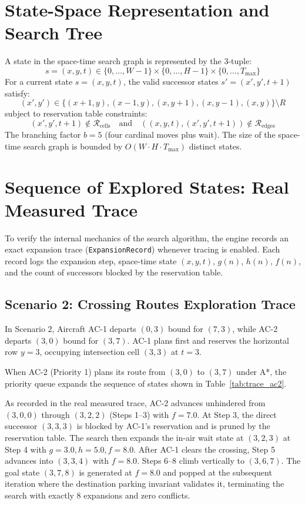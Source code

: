\documentclass[11pt,a4paper]{article}
\begin{document}
\section{State-Space Representation and Search Tree}
A state in the space-time search graph is represented by the 3-tuple:
\begin{equation}
s = (x, y, t) \in \{0, \dots, W-1\} \times \{0, \dots, H-1\} \times \{0, \dots, T_{\max}\}
\end{equation}
For a current state $s = (x, y, t)$, the valid successor states $s' = (x', y', t+1)$ satisfy:
\begin{equation}
(x', y') \in \{(x+1, y), (x-1, y), (x, y+1), (x, y-1), (x, y)\} \setminus R
\end{equation}
subject to reservation table constraints:
\begin{equation}
(x', y', t+1) \notin \mathcal{R}_{\text{cells}} \quad \text{and} \quad ((x, y, t), (x', y', t+1)) \notin \mathcal{R}_{\text{edges}}
\end{equation}
The branching factor $b = 5$ (four cardinal moves plus wait). The size of the space-time search graph is bounded by $O(W \cdot H \cdot T_{\max})$ distinct states.

\section{Sequence of Explored States: Real Measured Trace}
To verify the internal mechanics of the search algorithm, the engine records an exact expansion trace (\texttt{ExpansionRecord}) whenever tracing is enabled. Each record logs the expansion step, space-time state $(x, y, t)$, $g(n)$, $h(n)$, $f(n)$, and the count of successors blocked by the reservation table.

\subsection{Scenario 2: Crossing Routes Exploration Trace}
In Scenario 2, Aircraft AC-1 departs $(0, 3)$ bound for $(7, 3)$, while AC-2 departs $(3, 0)$ bound for $(3, 7)$. AC-1 plans first and reserves the horizontal row $y=3$, occupying intersection cell $(3, 3)$ at $t=3$.

When AC-2 (Priority 1) plans its route from $(3, 0)$ to $(3, 7)$ under A*, the priority queue expands the sequence of states shown in Table~\ref{tab:trace_ac2}.



As recorded in the real measured trace, AC-2 advances unhindered from $(3, 0, 0)$ through $(3, 2, 2)$ (Steps 1--3) with $f=7.0$. At Step 3, the direct successor $(3, 3, 3)$ is blocked by AC-1's reservation and is pruned by the reservation table. The search then expands the in-air wait state at $(3, 2, 3)$ at Step 4 with $g=3.0, h=5.0, f=8.0$. After AC-1 clears the crossing, Step 5 advances into $(3, 3, 4)$ with $f=8.0$. Steps 6--8 climb vertically to $(3, 6, 7)$. The goal state $(3, 7, 8)$ is generated at $f=8.0$ and popped at the subsequent iteration where the destination parking invariant validates it, terminating the search with exactly 8 expansions and zero conflicts.
\end{document}
